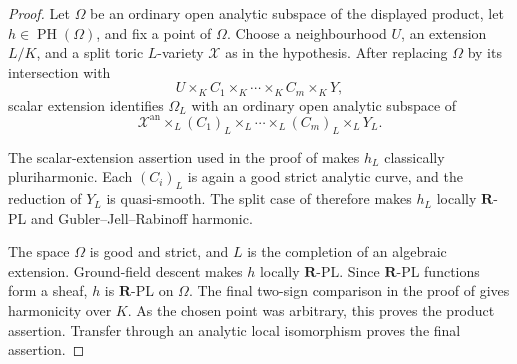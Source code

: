 \begin{proof}
Let $\Omega$ be an ordinary open analytic subspace of the displayed
product, let $h\in\operatorname{PH}(\Omega)$, and fix a point of $\Omega$.
Choose a neighbourhood $U$, an extension $L/K$, and a split toric
$L$-variety $\mathcal X$ as in the hypothesis.  After replacing $\Omega$
by its intersection with
\[
 U\times_K C_1\times_K\cdots\times_K C_m\times_KY,
\]
scalar extension identifies $\Omega_L$ with an ordinary open analytic
subspace of
\[
 \mathcal X^{\mathrm{an}}\times_L(C_1)_L\times_L\cdots
       \times_L(C_m)_L\times_LY_L.
\]

The scalar-extension assertion used in the proof of
 makes $h_L$
classically pluriharmonic.  Each $(C_i)_L$ is again a good strict analytic
curve, and the reduction of $Y_L$ is quasi-smooth.  The split case of
 therefore makes
$h_L$ locally $\mathbf R$-PL and Gubler--Jell--Rabinoff harmonic.

The space $\Omega$ is good and strict, and $L$ is the completion of an
algebraic extension.  Ground-field descent
\cite[Corollary~5.12]{GJR26} makes $h$ locally $\mathbf R$-PL.  Since
$\mathbf R$-PL functions form a sheaf, $h$ is $\mathbf R$-PL on $\Omega$.
The final two-sign comparison in the proof of
 gives harmonicity over
$K$.  As the chosen point was arbitrary, this proves the product assertion.
Transfer through an analytic local isomorphism proves the final assertion.
\end{proof}
